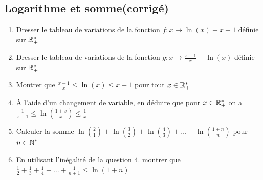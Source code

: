 \documentclass[oneside,12pt]{book}          %
\begin{document}
\subsection{Logarithme et somme\quad\small{(corrigé)}}
\begin{enumerate}
	\item Dresser le tableau de variations de la fonction $f:x\mapsto \ln(x)-x+1$ définie sur ${\mathbb R}_+^*$
	\item Dresser le tableau de variations de la fonction $g:x\mapsto \frac{x-1}{x}-\ln(x)$ définie sur ${\mathbb R}_+^*$
    \item Montrer que $\frac{x-1}{x}\leq\ln(x)\leq x-1$ pour tout $x\in{\mathbb R}^*_+$ 
    \item À l'aide d'un changement de variable, en déduire que pour $x\in{\mathbb R}^*_+$ on a $\frac{1}{x+1}\leq\ln\left(\frac{1+x}{x}\right)\leq\frac{1}{x}$
    \item Calculer la somme $\ln\left(\frac{2}{1}\right)+\ln\left(\frac{3}{2}\right)+\ln\left(\frac{4}{3}\right)+\ldots+\ln\left(\frac{1+n}{n}\right)$ pour ${n\in\mathbb N}^*$
    \item En utilisant l'inégalité de la question 4. montrer que $\frac{1}{2}+\frac{1}{3}+\frac{1}{4}+\ldots+\frac{1}{n+1}\leq\ln\left(1+n\right)$
\end{enumerate}
\end{document}

